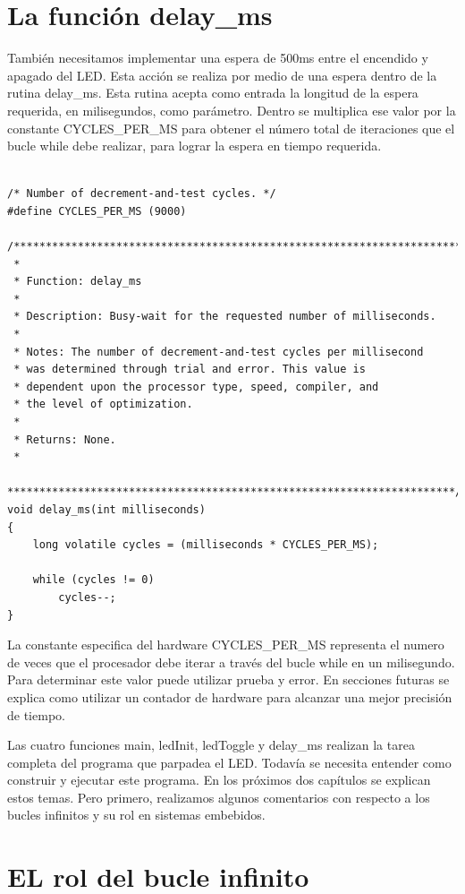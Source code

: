 \documentclass[12pt]{article}
\begin{document}
\section *{La función delay\_ms}

También necesitamos implementar una espera de 500ms entre el encendido y apagado
del LED. Esta acción se realiza por medio de una espera dentro de la rutina
delay\_ms.
Esta rutina acepta como entrada la longitud de la espera requerida, en milisegundos, como parámetro. Dentro se multiplica ese valor por la constante
CYCLES\_PER\_MS para obtener el número total de iteraciones que el bucle
while debe realizar, para lograr la espera en tiempo requerida.


\begin{verbatim}

/* Number of decrement-and-test cycles. */
#define CYCLES_PER_MS (9000)

/**********************************************************************
 *
 * Function: delay_ms
 *
 * Description: Busy-wait for the requested number of milliseconds.
 *
 * Notes: The number of decrement-and-test cycles per millisecond
 * was determined through trial and error. This value is
 * dependent upon the processor type, speed, compiler, and
 * the level of optimization.  
 *
 * Returns: None.
 *
 **********************************************************************/
void delay_ms(int milliseconds)
{
    long volatile cycles = (milliseconds * CYCLES_PER_MS);

    while (cycles != 0)
        cycles--;
}
\end{verbatim}

La constante especifica del hardware CYCLES\_PER\_MS representa el numero
de veces que el procesador debe iterar a través del bucle while en un milisegundo.
Para determinar este valor puede utilizar prueba y error.
En secciones futuras se explica como utilizar un contador de hardware para
alcanzar una mejor precisión de tiempo. 

Las cuatro funciones main, ledInit, ledToggle y delay\_ms realizan la tarea completa del programa que parpadea el LED. Todavía se necesita entender como construir y ejecutar este programa. En los próximos dos capítulos se explican estos temas.
Pero primero, realizamos algunos comentarios con respecto a los bucles infinitos y su rol en sistemas embebidos.

\section *{EL rol del bucle infinito}
\end{document}
